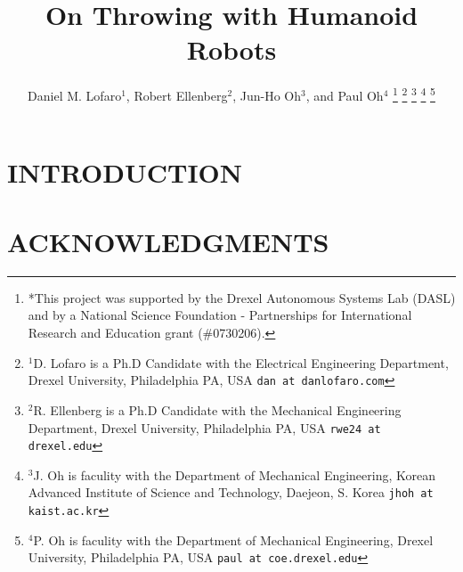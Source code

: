 \documentclass[letterpaper, 10 pt, conference]{ieeeconf}  %
\title{\LARGE \bf
On Throwing with Humanoid Robots
}
\author{Daniel M. Lofaro$^{1}$, Robert Ellenberg$^{2}$, Jun-Ho Oh$^{3}$, and Paul Oh$^{4}$%
\thanks{*This project was supported by the Drexel Autonomous Systems Lab (DASL) and by a National Science Foundation - Partnerships for International Research and Education grant (\#0730206).}%
\thanks{$^{1}$D. Lofaro is a Ph.D Candidate with the Electrical Engineering Department, Drexel University, Philadelphia PA, USA
        {\tt\small dan at danlofaro.com}}%
\thanks{$^{2}$R. Ellenberg is a Ph.D Candidate with the Mechanical Engineering Department, Drexel University, Philadelphia PA, USA
        {\tt\small rwe24 at drexel.edu}}%
\thanks{$^{3}$J. Oh is faculity with the Department of Mechanical Engineering, Korean Advanced Institute of Science and Technology, Daejeon, S. Korea
        {\tt\small jhoh at kaist.ac.kr}}%
\thanks{$^{4}$P. Oh is faculity with the Department of Mechanical Engineering, Drexel University, Philadelphia PA, USA
        {\tt\small paul at coe.drexel.edu}}%
}
\begin{document}
\maketitle
\thispagestyle{empty}
\pagestyle{empty}



\begin{abstract}
	
\end{abstract}


\section{INTRODUCTION}
	
	
%	
	
	
	

	

	

	
	
%	

\section{ACKNOWLEDGMENTS}
	

\end{document}
